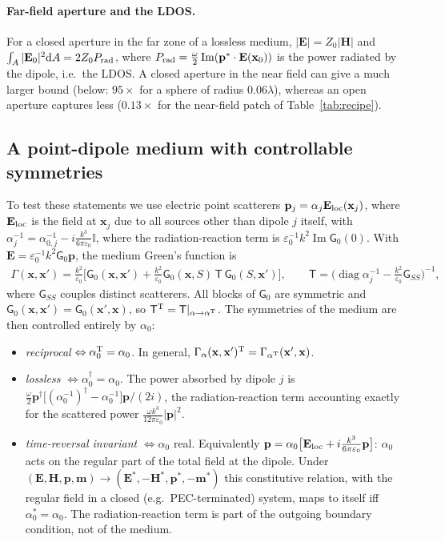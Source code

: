 \documentclass[11pt,letterpaper]{article}
\newcommand{\vect}[1]{\mathbf{#1}}
\newcommand{\Ev}{\vect{E}}
\newcommand{\Hv}{\vect{H}}
\newcommand{\xv}{\vect{x}}
\newcommand{\pv}{\vect{p}}
\newcommand{\mv}{\vect{m}}
\newcommand{\II}{\mathbb{I}}
\renewcommand{\Im}{\operatorname{Im}}
\begin{document}
\paragraph{Far-field aperture and the LDOS.} For a closed aperture in the far zone of a lossless medium, $|\Ev|=Z_0|\Hv|$ and $\int_A|\Ev_0|^2{\rm d}A=2Z_0P_{\rm rad}$, where $P_{\rm rad}=\tfrac\omega2\Im(\pv^*\cdot\Ev(\xv_0))$ is the power radiated by the dipole, i.e.\ the LDOS. A closed aperture in the near field can give a much larger bound (below: $95\times$ for a sphere of radius $0.06\lambda$), whereas an open aperture captures less ($0.13\times$ for the near-field patch of Table~\ref{tab:recipe}).

\subsection{A point-dipole medium with controllable symmetries}\label{sec:dipole-medium}
To test these statements we use electric point scatterers $\pv_j=\alpha_j\Ev_{\rm loc}(\xv_j)$, where $\Ev_{\rm loc}$ is the field at $\xv_j$ due to all sources other than dipole $j$ itself, with $\alpha_j^{-1}=\alpha_{0,j}^{-1}-i\tfrac{k^3}{6\pi\varepsilon_0}\II$, where the radiation-reaction term is $\varepsilon_0^{-1}k^2\Im\mathsf G_0(0)$. With $\Ev=\varepsilon_0^{-1}k^2\mathsf G_0\pv$, the medium Green's function is
\begin{align}
    \Gamma(\xv,\xv')=\frac{k^2}{\varepsilon_0}\Big[\mathsf G_0(\xv,\xv')+\frac{k^2}{\varepsilon_0}\mathsf G_0(\xv,S)\,\mathsf T\,\mathsf G_0(S,\xv')\Big],\qquad \mathsf T=\big(\operatorname{diag}\alpha_j^{-1}-\tfrac{k^2}{\varepsilon_0}\mathsf G_{SS}\big)^{-1},
\end{align}
where $\mathsf G_{SS}$ couples distinct scatterers. All blocks of $\mathsf G_0$ are symmetric and $\mathsf G_0(\xv,\xv')=\mathsf G_0(\xv',\xv)$, so $\mathsf T^{\rm T}=\mathsf T|_{\alpha\to\alpha^{\rm T}}$. The symmetries of the medium are then controlled entirely by $\alpha_0$:
\begin{itemize}
\item \emph{reciprocal} $\Leftrightarrow\alpha_0^{\rm T}=\alpha_0$. In general, $\Gamma_{\alpha}(\xv,\xv')^{\rm T}=\Gamma_{\alpha^{\rm T}}(\xv',\xv)$.
\item \emph{lossless} $\Leftrightarrow\alpha_0^\dagger=\alpha_0$. The power absorbed by dipole $j$ is $\tfrac\omega2\pv^\dagger\big[(\alpha_0^{-1})^\dagger-\alpha_0^{-1}\big]\pv/(2i)$, the radiation-reaction term accounting exactly for the scattered power $\tfrac{\omega k^3}{12\pi\varepsilon_0}|\pv|^2$.
\item \emph{time-reversal invariant} $\Leftrightarrow\alpha_0$ real. Equivalently $\pv=\alpha_0\big[\Ev_{\rm loc}+i\tfrac{k^3}{6\pi\varepsilon_0}\pv\big]$: $\alpha_0$ acts on the regular part of the total field at the dipole. Under $(\Ev,\Hv,\pv,\mv)\to(\Ev^*,-\Hv^*,\pv^*,-\mv^*)$ this constitutive relation, with the regular field in a closed (e.g.\ PEC-terminated) system, maps to itself iff $\alpha_0^*=\alpha_0$. The radiation-reaction term is part of the outgoing boundary condition, not of the medium.
\end{itemize}
\end{document}
